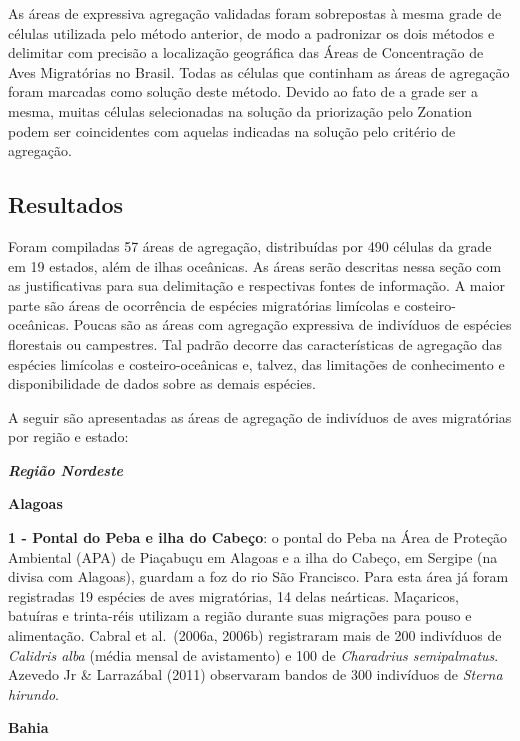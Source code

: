 \documentclass[
  oneside]{scrbook}
\begin{document}
As áreas de expressiva agregação validadas foram sobrepostas à mesma grade de células utilizada pelo método anterior, de modo a padronizar os dois métodos e delimitar com precisão a localização geográfica das Áreas de Concentração de Aves Migratórias no Brasil. Todas as células que continham as áreas de agregação foram marcadas como solução deste método. Devido ao fato de a grade ser a mesma, muitas células selecionadas na solução da priorização pelo Zonation podem ser coincidentes com aquelas indicadas na solução pelo critério de agregação.

\newpage

\hypertarget{resultados-1}{%
\subsection{Resultados}\label{resultados-1}}

Foram compiladas 57 áreas de agregação, distribuídas por 490 células da grade em 19 estados, além de ilhas oceânicas. As áreas serão descritas nessa seção com as justificativas para sua delimitação e respectivas fontes de informação. A maior parte são áreas de ocorrência de espécies migratórias limícolas e costeiro-oceânicas. Poucas são as áreas com agregação expressiva de indivíduos de espécies florestais ou campestres. Tal padrão decorre das características de agregação das espécies limícolas e costeiro-oceânicas e, talvez, das limitações de conhecimento e disponibilidade de dados sobre as demais espécies.

A seguir são apresentadas as áreas de agregação de indivíduos de aves migratórias por região e estado:

\textbf{\emph{Região Nordeste}}

\textbf{Alagoas}

\textbf{1 - Pontal do Peba e ilha do Cabeço}: o pontal do Peba na Área de Proteção Ambiental (APA) de Piaçabuçu em Alagoas e a ilha do Cabeço, em Sergipe (na divisa com Alagoas), guardam a foz do rio São Francisco. Para esta área já foram registradas 19 espécies de aves migratórias, 14 delas neárticas. Maçaricos, batuíras e trinta-réis utilizam a região durante suas migrações para pouso e alimentação. Cabral et al.~(2006a, 2006b) registraram mais de 200 indivíduos de \emph{Calidris alba} (média mensal de avistamento) e 100 de \emph{Charadrius semipalmatus}. Azevedo Jr \& Larrazábal (2011) observaram bandos de 300 indivíduos de \emph{Sterna hirundo}.

\textbf{Bahia}
\end{document}
